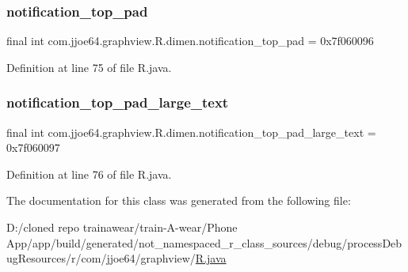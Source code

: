 \subsubsection{\texorpdfstring{notification\_top\_pad}{notification\_top\_pad}}
{\footnotesize\ttfamily final int com.\+jjoe64.\+graphview.\+R.\+dimen.\+notification\+\_\+top\+\_\+pad = 0x7f060096\hspace{0.3cm}{\ttfamily [static]}}



Definition at line 75 of file R.\+java.

\mbox{\label{classcom_1_1jjoe64_1_1graphview_1_1_r_1_1dimen_a1c92004b0b211cdd588c4dcbfdae0e85}} 
\subsubsection{\texorpdfstring{notification\_top\_pad\_large\_text}{notification\_top\_pad\_large\_text}}
{\footnotesize\ttfamily final int com.\+jjoe64.\+graphview.\+R.\+dimen.\+notification\+\_\+top\+\_\+pad\+\_\+large\+\_\+text = 0x7f060097\hspace{0.3cm}{\ttfamily [static]}}



Definition at line 76 of file R.\+java.



The documentation for this class was generated from the following file\+:\begin{DoxyCompactItemize}
\item 
D\+:/cloned repo trainawear/train-\/\+A-\/wear/\+Phone App/app/build/generated/not\+\_\+namespaced\+\_\+r\+\_\+class\+\_\+sources/debug/process\+Debug\+Resources/r/com/jjoe64/graphview/\mbox{\hyperlink{process_debug_resources_2r_2com_2jjoe64_2graphview_2_r_8java}{R.\+java}}\end{DoxyCompactItemize}
